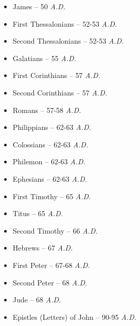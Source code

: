 \documentclass[std]{jbible}
\begin{document}
\begin{itemize}
  \item James – 50 \emph{A.D.}
  \item First Thessalonians – 52-53 \emph{A.D.}
  \item Second Thessalonians – 52-53 \emph{A.D.}
  \item Galatians – 55 \emph{A.D.}
  \item First Corinthians – 57 \emph{A.D.}
  \item Second Corinthians – 57 \emph{A.D.}
  \item Romans – 57-58 \emph{A.D.}
  \item Philippians – 62-63 \emph{A.D.}
  \item Colossians – 62-63 \emph{A.D.}
  \item Philemon – 62-63 \emph{A.D.}
  \item Ephesians – 62-63 \emph{A.D.}
  \item First Timothy – 65 \emph{A.D.}
  \item Titus – 65 \emph{A.D.}
  \item Second Timothy – 66 \emph{A.D.}
  \item Hebrews – 67 \emph{A.D.}
  \item First Peter – 67-68 \emph{A.D.}
  \item Second Peter – 68 \emph{A.D.}
  \item Jude – 68 \emph{A.D.}
  \item Epistles (Letters) of John – 90-95 \emph{A.D.}
\end{itemize}






















\end{document}
